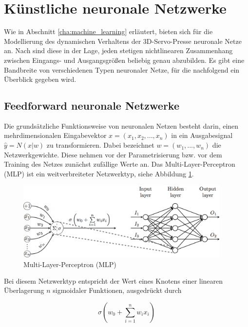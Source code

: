 \section{Künstliche neuronale Netzwerke}

Wie in Abschnitt \ref{cha:machine_learning} erläutert, bieten sich für die Modellierung des dynamischen Verhaltens der 3D-Servo-Presse neuronale Netze an. Nach \cite{Lipton.5292015} sind diese in der Lage, jeden stetigen nichtlinearen Zusammenhang zwischen Eingangs- und Ausgangsgrößen beliebig genau abzubilden. Es gibt eine Bandbreite von verschiedenen Typen neuronaler Netze, für die nachfolgend ein Überblick gegeben wird. 

\subsection{Feedforward neuronale Netzwerke}
\label{cha_ff}
Die grundsätzliche Funktionsweise von neuronalen Netzen besteht darin, einen mehrdimensionalen Eingabevektor $x = (x_1,x_2,...,x_n)$ in ein Ausgabesignal $\hat{y} = N(x|w)$ zu transformieren. Dabei bezeichnet $w = (w_1,...,w_n)$ die Netzwerkgewichte. Diese nehmen vor der Parametrisierung bzw. vor dem Training des Netzes zunächst zufällige Werte an. Das Multi-Layer-Perceptron (MLP) ist ein weitverbreiteter Netzwerktyp, siehe Abbildung \ref{fig:mlp}. 

\begin{figure} 
	\centering
	\includegraphics[width=0.95\textwidth]{images/MLP}
	\caption{Multi-Layer-Perceptron (MLP) \cite{Velickovic.2018}}
	\label{fig:mlp}
\end{figure}


Bei diesem Netzwerktyp entspricht der Wert eines Knotens einer linearen Überlagerung $n$ sigmoidaler Funktionen, ausgedrückt durch 

\begin{equation} 
\label{eq:feedforward}
\sigma(w_0 + \sum_{i=1}^{n} w_i x_i)
\end{equation}

